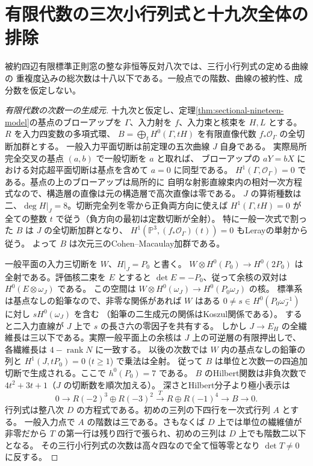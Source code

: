 \section{有限代数の三次小行列式と十九次全体の排除}
\label{sec:sectional-nineteen-stein-cubics}
\begin{theorem}\label{thm:sectional-nineteen-stein-cubics}
被約四辺有限標準正則窓の整な非恒等反対八次では、三行小行列式の定める曲線の
重複度込みの総次数は十八以下である。一般点での階数、曲線の被約性、成分数を仮定しない。
\end{theorem}
\begin{proof}[有限代数の次数一の生成元]
十九次と仮定し、定理\ref{thm:sectional-nineteen-model}の基点のブローアップを
$\Gamma$、入力射を $f$、入力束と核束を $H,L$ とする。$R$ を入力四変数の多項式環、
$B=\bigoplus_t H^0(\Gamma,tH)$ を有限直像代数 $f_*\mathcal O_\Gamma$ の全切断加群とする。
一般入力平面切断は前定理の五次曲線 $J$ 自身である。
実際局所完全交叉の基点 $(a,b)$ で一般切断を $a$ と取れば、
ブローアップの $aY=bX$ における対応超平面切断は基点を含めて $a=0$ に同型である。
$H^1(\Gamma,\mathcal O_\Gamma)=0$ である。基点の上のブローアップは局所的に
自明な射影直線束内の相対一次方程式なので、構造層の直像は元の構造層で高次直像は零である。
$J$ の算術種数は二、$\deg H|_J=8$。切断完全列を零から正負両方向に使えば
$H^1(\Gamma,tH)=0$ が全ての整数 $t$ で従う（負方向の最初は定数切断が全射）。
特に一般一次式で割った $B$ は $J$ の全切断加群となり、
$H^1(\mathbb P^3,(f_*\mathcal O_\Gamma)(t))=0$ もLerayの単射から従う。
よって $B$ は次元三のCohen--Macaulay加群である。

一般平面の入力三切断を $W$、$H|_J=P_0$ と書く。
$W\otimes H^0(P_0)\to H^0(2P_0)$ は全射である。評価核二束を $E$ とすると
$\det E=-P_0$、従って余核の双対は $H^0(E\otimes\omega_J)$ である。
この空間は $W\otimes H^0(\omega_J)\to H^0(P_0\omega_J)$ の核。
標準系は基点なしの鉛筆なので、非零な関係があれば $W$ はある
$0\ne s\in H^0(P_0\omega_J^{-1})$ に対し $s H^0(\omega_J)$ を含む
（鉛筆の二生成元の関係はKoszul関係である）。
すると二入力直線が $J$ 上で $s$ の長さ六の零因子を共有する。
しかし $J\to E_H$ の全繊維長は三以下である。実際一般平面上の余核は
$J$ 上の可逆層の有限押出しで、各繊維長は $4-\operatorname{rank}N$ に一致する。
以後の次数では $W$ 内の基点なしの鉛筆の列と $H^1(J,tP_0)=0$ ($t\ge1$) で乗法は全射。
従って $B$ は単位と次数一の四追加切断で生成される。ここで $h^0(P_0)=7$ である。
$B$ のHilbert関数は非負次数で $4t^2+3t+1$（$J$ の切断数を順次加える）。
深さとHilbert分子より極小表示は
\[
 0\longrightarrow R(-2)^3\oplus R(-3)^2\xrightarrow{T}
 R\oplus R(-1)^4\longrightarrow B\longrightarrow0 .
\]
行列式は整八次 $D$ の方程式である。初めの三列の下四行を一次式行列 $A$ とする。
一般入力点で $A$ の階数は三である。さもなくば $D$ 上では単位の繊維値が非零だから
$T$ の第一行は残り四行で張られ、初めの三列は $D$ 上でも階数二以下となる。
その三行小行列式の次数は高々四なので全て恒等零となり $\det T\ne0$ に反する。
\end{proof}


